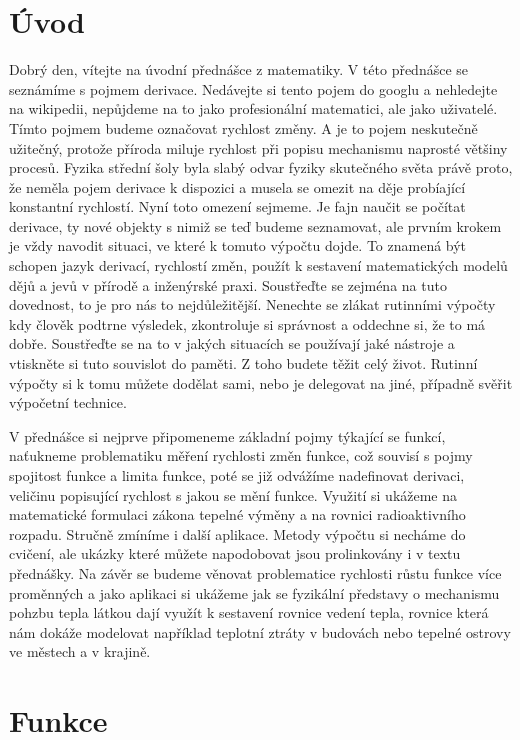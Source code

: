 \documentclass[12pt]{article}
\begin{document}
\section*{Úvod}

Dobrý den, vítejte na úvodní přednášce z matematiky. V této přednášce se seznámíme s pojmem derivace. Nedávejte si tento pojem do googlu a nehledejte na wikipedii, nepůjdeme na to jako profesionální matematici, ale jako uživatelé. Tímto pojmem budeme označovat rychlost změny. A je to pojem neskutečně užitečný, protože příroda miluje rychlost při popisu mechanismu naprosté většiny procesů. Fyzika střední šoly byla slabý odvar fyziky skutečného světa právě proto, že neměla pojem derivace k dispozici a musela se omezit na děje probíající konstantní rychlostí. Nyní toto omezení sejmeme. Je fajn naučit se počítat derivace, ty nové objekty s nimiž se teď budeme seznamovat, ale prvním krokem je vždy navodit situaci, ve které k tomuto výpočtu dojde. To znamená být schopen jazyk derivací, rychlostí změn, použít k sestavení matematických modelů dějů a jevů v přírodě a inženýrské praxi. Soustřeďte se zejména na tuto dovednost, to je pro nás to nejdůležitější. Nenechte se zlákat rutinními výpočty kdy člověk podtrne výsledek, zkontroluje si správnost a oddechne si, že to má dobře. Soustřeďte se na to v jakých situacích se používají jaké nástroje a vtiskněte si tuto souvislot do paměti. Z toho budete těžit celý život. Rutinní výpočty si k tomu můžete dodělat sami, nebo je delegovat na jiné, případně svěřit výpočetní technice.

V přednášce si nejprve připomeneme základní pojmy týkající se funkcí, naťukneme problematiku měření rychlosti změn funkce, což souvisí s pojmy spojitost funkce  a limita funkce, poté se již odvážíme nadefinovat derivaci, veličinu popisující rychlost s jakou se mění funkce. Využití si ukážeme na matematické formulaci zákona tepelné výměny a na rovnici radioaktivního rozpadu. Stručně zmíníme i další aplikace. Metody výpočtu si necháme do cvičení, ale ukázky které můžete napodobovat jsou prolinkovány i v textu přednášky. Na závěr se budeme věnovat problematice rychlosti růstu funkce více proměnných a jako aplikaci si ukážeme jak se fyzikální představy o mechanismu pohzbu tepla látkou dají využít k sestavení rovnice vedení tepla, rovnice která nám dokáže modelovat například teplotní ztráty v budovách nebo tepelné ostrovy ve městech a v krajině. 

\section*{Funkce}
\end{document}
